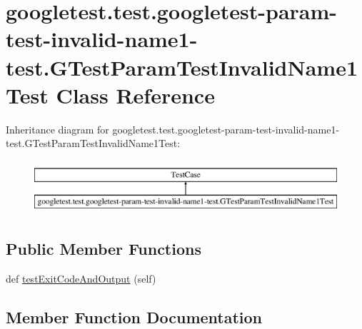 \hypertarget{classgoogletest_1_1test_1_1googletest-param-test-invalid-name1-test_1_1_g_test_param_test_invalid_name1_test}{}\section{googletest.\+test.\+googletest-\/param-\/test-\/invalid-\/name1-\/test.G\+Test\+Param\+Test\+Invalid\+Name1\+Test Class Reference}
\label{classgoogletest_1_1test_1_1googletest-param-test-invalid-name1-test_1_1_g_test_param_test_invalid_name1_test}
Inheritance diagram for googletest.\+test.\+googletest-\/param-\/test-\/invalid-\/name1-\/test.G\+Test\+Param\+Test\+Invalid\+Name1\+Test\+:\begin{figure}[H]
\begin{center}
\leavevmode
\includegraphics[height=2.000000cm]{dc/d09/classgoogletest_1_1test_1_1googletest-param-test-invalid-name1-test_1_1_g_test_param_test_invalid_name1_test}
\end{center}
\end{figure}
\subsection*{Public Member Functions}
\begin{DoxyCompactItemize}
\item 
def \mbox{\hyperlink{classgoogletest_1_1test_1_1googletest-param-test-invalid-name1-test_1_1_g_test_param_test_invalid_name1_test_a9ff80d651c02fd0710e927b0a8ece4de}{test\+Exit\+Code\+And\+Output}} (self)
\end{DoxyCompactItemize}


\subsection{Member Function Documentation}
\mbox{\label{classgoogletest_1_1test_1_1googletest-param-test-invalid-name1-test_1_1_g_test_param_test_invalid_name1_test_a9ff80d651c02fd0710e927b0a8ece4de}} 
